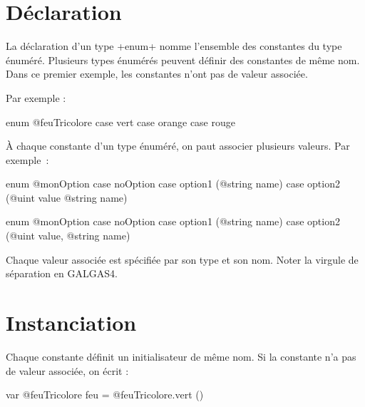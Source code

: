 




\section{Déclaration}

La déclaration d'un type \ggst+enum+ nomme l'ensemble des constantes du type énuméré. Plusieurs types énumérés peuvent définir des constantes de même nom. Dans ce premier exemple, les constantes n'ont pas de valeur associée.

Par exemple :

\begin{galgas34}
enum @feuTricolore {
  case vert
  case orange
  case rouge
}
\end{galgas34}

À chaque constante d'un type énuméré, on paut associer plusieurs valeurs. Par exemple~:

\begin{galgas3}
enum @monOption {
  case noOption
  case option1 (@string name)
  case option2 (@uint value @string name)
}
\end{galgas3}

\begin{galgas4}
enum @monOption {
  case noOption
  case option1 (@string name)
  case option2 (@uint value, @string name)
}
\end{galgas4}

Chaque valeur associée est spécifiée par son type et son nom. Noter la virgule de séparation en GALGAS4.






\section{Instanciation}

Chaque constante définit un initialisateur de même nom. Si la constante n'a pas de valeur associée, on écrit :

\begin{galgas34}
var @feuTricolore feu = @feuTricolore.vert ()
\end{galgas34}

